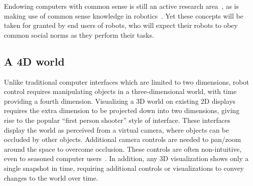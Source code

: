 \documentclass[10pt,twocolumn]{article}
\begin{document}
Endowing computers with common sense is still an active research area~\cite{mueller-cacm09}, as is making use of common sense knowledge in robotics~\cite{gupta-aaai04}. Yet these concepts will be taken for granted by end users of robots, who will expect their robots to obey common social norms as they perform their tasks.

\subsection{A 4D world}


Unlike traditional computer interfaces which are limited to two dimensions, robot control requires manipulating objects in a three-dimensional world, with time providing a fourth dimension. Visualizing a 3D world on existing 2D displays requires the extra dimension to be projected down into two dimensions, giving rise to the popular ``first person shooter'' style of interface. These interfaces display the world as perceived from a virtual camera, where objects can be occluded by other objects. Additional camera controls are needed to pan/zoom around the space to overcome occlusion. These controls are often non-intuitive, even to seasoned computer users~\cite{ioannidou-jvlc09}. In addition, any 3D visualization shows only a single snapshot in time, requiring additional controls or visualizations to convey changes to the world over time.

%
%
\end{document}
